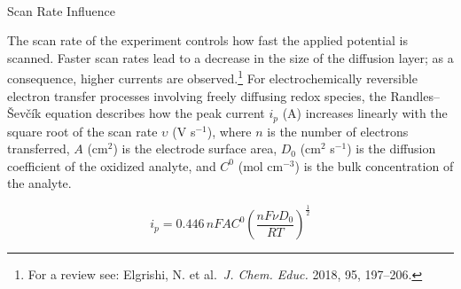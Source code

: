 \documentclass[
  letterpaper,
  DIV=11,
  numbers=noendperiod]{scrartcl}
\makeatletter
\let\oldparagraph\paragraph
\renewcommand{\paragraph}{
    \@ifstar
      \xxxParagraphStar
      \xxxParagraphNoStar
  }
\newcommand{\xxxParagraphStar}[1]{\oldparagraph*{#1}\mbox{}}
\newcommand{\xxxParagraphNoStar}[1]{\oldparagraph{#1}\mbox{}}
\makeatother
\begin{document}
\paragraph{Scan Rate Influence}\label{scan-rate-influence}

The scan rate of the experiment controls how fast the applied potential
is scanned. Faster scan rates lead to a decrease in the size of the
diffusion layer; as a consequence, higher currents are
observed.\footnote{For a review see: Elgrishi, N. et al.~\emph{J. Chem.
  Educ.} 2018, 95, 197--206.} For electrochemically reversible electron
transfer processes involving freely diffusing redox species, the
Randles--Ševčík equation describes how the peak current \(i_p\) (A)
increases linearly with the square root of the scan rate \(\upsilon\) (V
s\(^{-1}\)), where \(n\) is the number of electrons transferred, \(A\)
(cm\(^2\)) is the electrode surface area, \(D_0\) (cm\(^2\) s\(^{-1}\))
is the diffusion coefficient of the oxidized analyte, and \(C^0\) (mol
cm\(^{-3}\)) is the bulk concentration of the analyte.

\[
i_p = 0.446\, nFAC^0 \left(\frac{nF\nu D_0}{RT}\right)^{\frac{1}{2}}
\]
\end{document}
